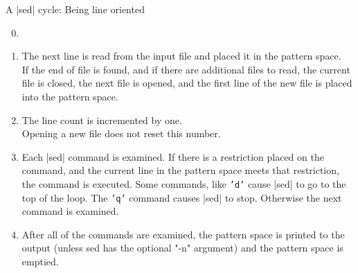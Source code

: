 \begin{frame}{A \bash|sed| cycle: Being line oriented}
    \vspace{-4mm}
    \begin{overlayarea}{\textwidth}{0.26\textheight}
        \begin{enumerate}
            \setcounter{enumi}{-1}
            \item<only@0> %
            \item<only@2> The next line is read from the input file and placed it in the pattern space.\\
                          If the end of file is found, and if there are additional files to read, the current file is closed, the next file is opened, and the first line of the new file is placed into the pattern space.
            \item<only@3> The line count is incremented by one.\\
                          Opening a new file does not reset this number.
            \item<only@4> Each \bash|sed| command is examined.
                          If there is a restriction placed on the command, and the current line in the pattern space meets that restriction, the command is executed.
                          Some commands, like \texttt{'d'} cause \bash|sed| to go to the top of the loop.
                          The \texttt{'q'} command causes \bash|sed| to stop.
                          Otherwise the next command is examined.
            \item<only@5> After all of the commands are examined, the pattern space is printed to the output (unless sed has the optional "-n" argument) and the pattern space is emptied.
        \end{enumerate}%
    \end{overlayarea}
    \begin{center}
\end{center}
\end{frame}
